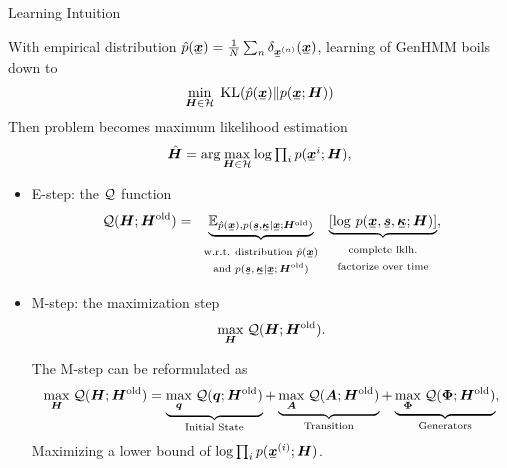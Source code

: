 \begin{frame}{Learning Intuition}
  
  With empirical distribution $\hat{p}(\ubm{x}) = \frac{1}{N}\sum_{n}\delta_{\ubm{x}^{(n)}}(\ubm{x})$, learning of GenHMM boils down to
  \begin{equation*}
    \min_{\bm{H}\in \Hh}\;\mathrm{KL}(\hat{p}(\ubm{x})\|p(\ubm{x};\bm{H}))
  \end{equation*}
  Then problem becomes maximum likelihood estimation \\
  \begin{equation*}
    \hat{\bm{H}} =    \arg \max_{\bm{H} \in \Hh} \log \textstyle\prod_{i} p(\ubm{x}^{i};\bm{H}),
  \end{equation*}

  \begin{itemize}
  \item E-step: 
    the $\mathcal{Q}$ function
    \begin{equation*}\label{eq:em-q-funciton}
      \Qq(\bm{H}; \bm{H}^{\mathrm{old}}) = \underbrace{\EE_{\hat{p}(\ubm{x}),p(\ubm{s},\ubm{\kappa}| \ubm{x}; \bm{H}^{\mathrm{old}})}}_{\text{\begin{tabular}{c}w.r.t. distribution $\hat{p}(\ubm{x})$ \\and $p(\ubm{s},\ubm{\kappa}| \ubm{x}; \bm{H}^{\mathrm{old}})$\end{tabular}}} \underbrace{\left[\log\,p(\ubm{x}, \ubm{s}, \ubm{\kappa}; \bm{H})\right]}_{\text{\begin{tabular}{c}complete lklh.\\ factorize over time\end{tabular}}},
    \end{equation*}
    
  \item M-step: the maximization step
    \begin{equation*}\label{eq:em-m-opt}
      \underset{\bm{H}}{\max}\; \mathcal{Q}(\bm{H}; \bm{H}^{\mathrm{old}}).
    \end{equation*}

    The M-step can be reformulated as
    \begin{align}\label{eq:m-step-subs}
      \underset{\bm{H}}{\max}\; \mathcal{Q}(\bm{H}; \bm{H}^{\mathrm{old}})
      =\underbrace{\underset{\bm{q}}{\max}\;\mathcal{Q}(\bm{q}; \bm{H}^{\mathrm{old}})}_\text{Initial State}
      + \underbrace{\underset{\bm{A}}{\max}\;\mathcal{Q}(\bm{A}; \bm{H}^{\mathrm{old}})}_\text{Transition} 
      + \underbrace{\underset{\bm{\Phi}}{\max}\;\mathcal{Q}(\bm{\Phi}; \bm{H}^{\mathrm{old}})}_\text{Generators},
    \end{align}
    Maximizing a lower bound of $\log \textstyle\prod_{i} p(\ubm{x}^{(i)};\bm{H})$.


\end{itemize}
\end{frame}
